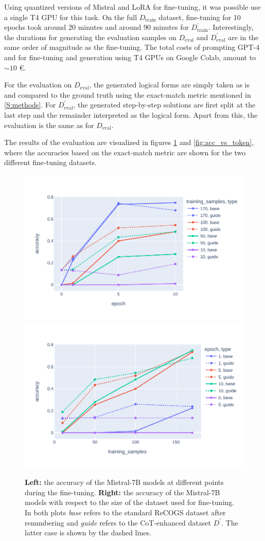 \documentclass[11pt]{article}
\begin{document}
    Using quantized versions of Mistral \cite{unsloth_unslothmistral-7b-instruct-v02-bnb-4bit_2024} and LoRA for fine-tuning,
    it was possible use a single T4 GPU for this task.
    On the full $D_\mathrm{train}$ dataset, fine-tuning for 10 epochs took around 20 minutes and around 90 minutes
    for $D_\mathrm{train}^\prime$.
    Interestingly, the durations for generating the evaluation samples on $D_\mathrm{eval}$ and $D_\mathrm{eval}^\prime$
    are in the same order of magnitude as the fine-tuning.
    The total costs of prompting GPT-4 and for fine-tuning and generation using T4 GPUs on Google Colab, amount to $\sim 10$ \euro.

    For the evaluation on $D_\mathrm{eval}$, the generated logical forms are simply taken as is and compared to the ground
    truth using the exact-match metric mentioned in \ref{S:methods}.
    For $D_\mathrm{eval}^\prime$, the generated step-by-step solutions are first split at the last step and the remainder
    interpreted as the logical form.
    Apart from this, the evaluation is the same as for $D_\mathrm{eval}$.

    The results of the evaluation are visualized in figures  \ref{fig:acc_vs_data_and_epoch} and  \ref{fig:acc_vs_token},
    where the accuracies based on the exact-match metric are shown for the two different fine-tuning datasets.

    \begin{figure}
        \centering
        \includegraphics[width=0.49\linewidth]{../plots/accuracy_vs_epoch.pdf}
        \includegraphics[width=0.49\linewidth]{../plots/accuracy_vs_data.pdf}
        \caption{
            \textbf{Left:} the accuracy of the Mistral-7B models at different points during the fine-tuning.
            \textbf{Right:} the accuracy of the Mistral-7B models with respect to the size of the dataset used for fine-tuning.\\
            In both plots \emph{base} refers to the standard ReCOGS dataset after renumbering and \emph{guide}
            refers to the CoT-enhanced dataset $D^\prime$. The latter case is shown by the dashed lines.
        }
        \label{fig:acc_vs_data_and_epoch}
    \end{figure}
\end{document}
